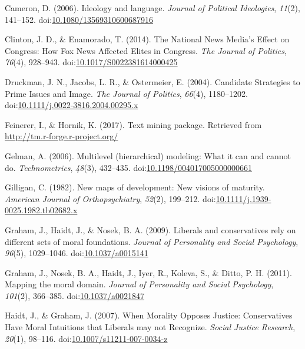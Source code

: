 \documentclass[,man]{apa6}
\begin{document}
\hypertarget{ref-Cameron2006}{}
Cameron, D. (2006). Ideology and language. \emph{Journal of Political
Ideologies}, \emph{11}(2), 141--152.
doi:\href{https://doi.org/10.1080/13569310600687916}{10.1080/13569310600687916}

\hypertarget{ref-Clinton2014}{}
Clinton, J. D., \& Enamorado, T. (2014). The National News Media's
Effect on Congress: How Fox News Affected Elites in Congress. \emph{The
Journal of Politics}, \emph{76}(4), 928--943.
doi:\href{https://doi.org/10.1017/S0022381614000425}{10.1017/S0022381614000425}

\hypertarget{ref-Druckman2004}{}
Druckman, J. N., Jacobs, L. R., \& Ostermeier, E. (2004). Candidate
Strategies to Prime Issues and Image. \emph{The Journal of Politics},
\emph{66}(4), 1180--1202.
doi:\href{https://doi.org/10.1111/j.0022-3816.2004.00295.x}{10.1111/j.0022-3816.2004.00295.x}

\hypertarget{ref-Feinerer2017}{}
Feinerer, I., \& Hornik, K. (2017). Text mining package. Retrieved from
\url{http://tm.r-forge.r-project.org/}

\hypertarget{ref-Gelman2006}{}
Gelman, A. (2006). Multilevel (hierarchical) modeling: What it can and
cannot do. \emph{Technometrics}, \emph{48}(3), 432--435.
doi:\href{https://doi.org/10.1198/004017005000000661}{10.1198/004017005000000661}

\hypertarget{ref-Gilligan1982}{}
Gilligan, C. (1982). New maps of development: New visions of maturity.
\emph{American Journal of Orthopsychiatry}, \emph{52}(2), 199--212.
doi:\href{https://doi.org/10.1111/j.1939-0025.1982.tb02682.x}{10.1111/j.1939-0025.1982.tb02682.x}

\hypertarget{ref-Graham2009}{}
Graham, J., Haidt, J., \& Nosek, B. A. (2009). Liberals and
conservatives rely on different sets of moral foundations. \emph{Journal
of Personality and Social Psychology}, \emph{96}(5), 1029--1046.
doi:\href{https://doi.org/10.1037/a0015141}{10.1037/a0015141}

\hypertarget{ref-Graham2011}{}
Graham, J., Nosek, B. A., Haidt, J., Iyer, R., Koleva, S., \& Ditto, P.
H. (2011). Mapping the moral domain. \emph{Journal of Personality and
Social Psychology}, \emph{101}(2), 366--385.
doi:\href{https://doi.org/10.1037/a0021847}{10.1037/a0021847}

\hypertarget{ref-Haidt2007}{}
Haidt, J., \& Graham, J. (2007). When Morality Opposes Justice:
Conservatives Have Moral Intuitions that Liberals may not Recognize.
\emph{Social Justice Research}, \emph{20}(1), 98--116.
doi:\href{https://doi.org/10.1007/s11211-007-0034-z}{10.1007/s11211-007-0034-z}
\end{document}
